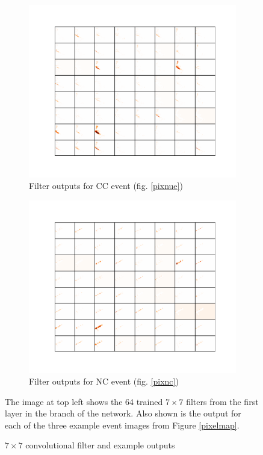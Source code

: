 \begin{figure}[t]
\begin{center}
\begin{subfigure}[b]{0.49\textwidth}
\includegraphics[width=\textwidth]{figures/cnn/feat1_truetype6_caltype6_event155_y.pdf}
\vspace{-20pt}
\caption*{Filter outputs for \nue CC event (fig. \ref{pixnue})}
\end{subfigure}
\begin{subfigure}[b]{0.49\textwidth}
\includegraphics[width=\textwidth]{figures/cnn/feat1_truetype13_caltype6_event144_y.pdf}
\caption*{Filter outputs for NC event (fig. \ref{pixnc})}
\end{subfigure}
\end{center}

\caption{$7\times7$ convolutional filter and example outputs}{The image at top
left shows the 64 trained $7\times7$ filters from the first layer in the \yview
branch of the network.  Also shown is the output for each of the three example
event images from Figure \ref{pixelmap}.}
\label{convexamples}
\end{figure}


